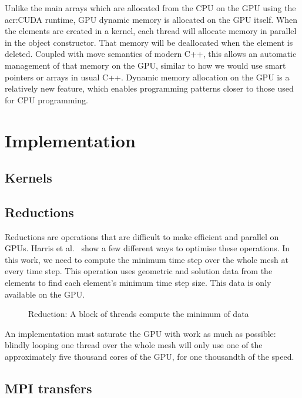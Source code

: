 Unlike the main arrays which are allocated from the CPU on the GPU using the \acrshort{acr:CUDA}
runtime, GPU dynamic memory is allocated on the GPU itself. When the elements are created in a
kernel, each thread will allocate memory in parallel in the object constructor. That memory will be
deallocated when the element is deleted. Coupled with move semantics of modern C++, this allows an
automatic management of that memory on the GPU, similar to how we would use smart pointers or arrays
in usual C++. Dynamic memory allocation on the GPU is a relatively new feature, which enables
programming patterns closer to those used for CPU programming.

\section{Implementation} \label{section:graphics_processing_units:implementation}

\subsection{Kernels} \label{subsection:graphics_processing_units:implementation:kernels}

\subsection{Reductions} \label{subsection:graphics_processing_units:implementation:reductions}

Reductions are operations that are difficult to make efficient and parallel on GPUs. Harris et
al.~\cite{Harris2007} show a few different ways to optimise these operations. In this work, we need
to compute the minimum time step over the whole mesh at every time step. This operation uses
geometric and solution data from the elements to find each element's minimum time step size. This
data is only available on the GPU. 

\begin{figure}[H]
	\centering
	
	\caption{Reduction: A block of threads compute the minimum of data}
	\label{fig:reduction}
\end{figure}

An implementation must saturate the GPU with work as much as possible: blindly looping one thread
over the whole mesh will only use one of the approximately five thousand cores of the GPU, for one
thousandth of the speed. 

\subsection{MPI transfers} \label{subsection:graphics_processing_units:implementation:mpi_transfers}
